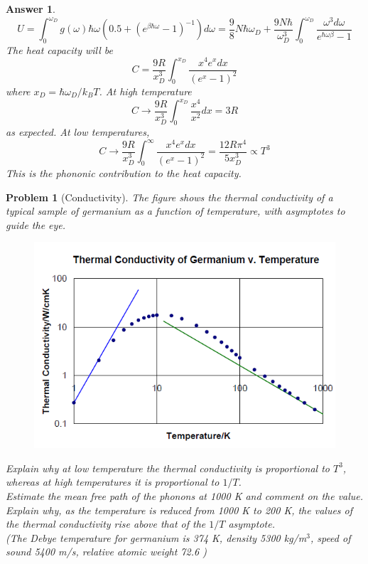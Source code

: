 \documentclass[a4paper]{article}
\newtheorem{ans}{Answer}[section]
\theoremstyle{new}
\newtheorem{qns}{Problem}[section]
\begin{document}
\begin{ans}
$$U=\int_0^{\omega_D}g(\omega)\hbar\omega(0.5+(e^{\beta\hbar\omega}-1)^{-1})d\omega=\frac{9}{8}N\hbar\omega_D+\frac{9N\hbar}{\omega_D^3}\int_0^{\omega_D}\frac{\omega^3d\omega}{e^{\hbar\omega\beta}-1}$$
The heat capacity will be
$$C=\frac{9R}{x_D^3}\int_0^{x_D}\frac{x^4e^xdx}{(e^x-1)^2}$$
where $x_D=\hbar\omega_D/k_BT$. At high temperature
$$C\rightarrow\frac{9R}{x_D^3}\int_0^{x_D}\frac{x^4}{x^2}dx=3R$$
as expected. At low temperatures,
$$C\rightarrow\frac{9R}{x_D^3}\int_0^\infty\frac{x^4e^xdx}{(e^x-1)^2}=\frac{12R\pi^4}{5x_D^3}\propto T^3$$
This is the phononic contribution to the heat capacity.
\end{ans}
\newpage
\begin{qns}[Conductivity]
The figure shows the thermal conductivity of a typical sample of germanium as a function of temperature, with asymptotes to guide the eye.
\begin{figure}[H]
    \centering
    \includegraphics[width=\linewidth]{4_7.PNG}
    \end{figure}
Explain why at low temperature the thermal conductivity is proportional to $T^3$, whereas at high temperatures it is proportional to $1/T$.\\[5pt]
Estimate the mean free path of the phonons at 1000 K and comment on the value.\\[5pt]
Explain why, as the temperature is reduced from 1000 K to 200 K, the values of the thermal conductivity rise above that of the $1/T$ asymptote.\\[5pt]
(The Debye temperature for germanium is 374 K, density 5300 kg/m$^3$, speed of sound 5400 m/s, relative atomic weight 72.6 )
\end{qns}
\end{document}
